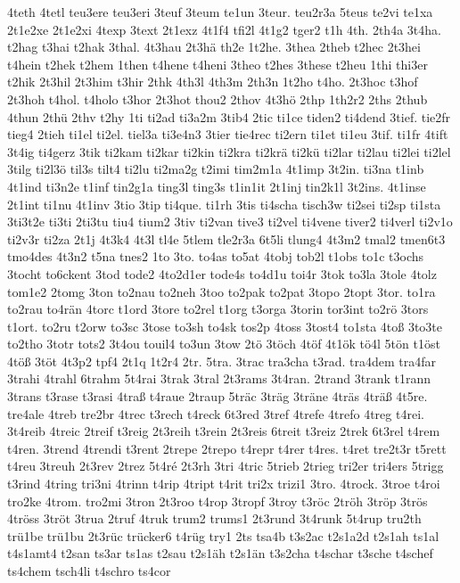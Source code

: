 {4teth
4tetl
teu3ere
teu3eri
3teuf
3teum
te1un
3teur.
teu2r3a
5teus
te2vi
te1xa
2t1e2xe
2t1e2xi
4texp
3text
2t1exz
4t1f4
tfi2l
4t1g2
tger2
t1h
4th.
2th4a
3t4ha.
t2hag
t3hai
t2hak
3thal.
4t3hau
2t3hä
th2e
1t2he.
3thea
2theb
t2hec
2t3hei
t4hein
t2hek
t2hem
1then
t4hene
t4heni
3theo
t2hes
3these
t2heu
1thi
thi3er
t2hik
2t3hil
2t3him
t3hir
2thk
4th3l
4th3m
2th3n
1t2ho
t4ho.
2t3hoc
t3hof
2t3hoh
t4hol.
t4holo
t3hor
2t3hot
thou2
2thov
4t3hö
2thp
1th2r2
2ths
2thub
4thun
2thü
2thv
t2hy
1ti
ti2ad
ti3a2m
3tib4
2tic
ti1ce
tiden2
ti4dend
3tief.
tie2fr
tieg4
2tieh
ti1el
ti2el.
tiel3a
ti3e4n3
3tier
tie4rec
ti2ern
ti1et
ti1eu
3tif.
ti1fr
4tift
3t4ig
ti4gerz
3tik
ti2kam
ti2kar
ti2kin
ti2kra
ti2krä
ti2kü
ti2lar
ti2lau
ti2lei
ti2lel
3tilg
ti2l3ö
til3s
tilt4
ti2lu
ti2ma2g
t2imi
tim2m1a
4t1imp
3t2in.
ti3na
t1inb
4t1ind
ti3n2e
t1inf
tin2g1a
ting3l
ting3s
t1in1it
2t1inj
tin2k1l
3t2ins.
4t1inse
2t1int
ti1nu
4t1inv
3tio
3tip
ti4que.
ti1rh
3tis
ti4scha
tisch3w
ti2sei
ti2sp
ti1sta
3ti3t2e
ti3ti
2ti3tu
tiu4
tium2
3tiv
ti2van
tive3
ti2vel
ti4vene
tiver2
ti4verl
ti2v1o
ti2v3r
ti2za
2t1j
4t3k4
4t3l
tl4e
5tlem
tle2r3a
6t5li
tlung4
4t3m2
tmal2
tmen6t3
tmo4des
4t3n2
t5na
tnes2
1to
3to.
to4as
to5at
4tobj
tob2l
t1obs
to1c
t3ochs
3tocht
to6ckent
3tod
tode2
4to2d1er
tode4s
to4d1u
toi4r
3tok
to3la
3tole
4tolz
tom1e2
2tomg
3ton
to2nau
to2neh
3too
to2pak
to2pat
3topo
2topt
3tor.
to1ra
to2rau
to4rän
4torc
t1ord
3tore
to2rel
t1org
t3orga
3torin
tor3int
to2rö
3tors
t1ort.
to2ru
t2orw
to3sc
3tose
to3sh
to4sk
tos2p
4toss
3tost4
to1sta
4toß
3to3te
to2tho
3totr
tots2
3t4ou
touil4
to3un
3tow
2tö
3töch
4töf
4t1ök
tö4l
5tön
t1öst
4töß
3töt
4t3p2
tpf4
2t1q
1t2r4
2tr.
5tra.
3trac
tra3cha
t3rad.
tra4dem
tra4far
3trahi
4trahl
6trahm
5t4rai
3trak
3tral
2t3rams
3t4ran.
2trand
3trank
t1rann
3trans
t3rase
t3rasi
4traß
t4raue
2traup
5träc
3träg
3träne
4träs
4träß
4t5re.
tre4ale
4treb
tre2br
4trec
t3rech
t4reck
6t3red
3tref
4trefe
4trefo
4treg
t4rei.
3t4reib
4treic
2treif
t3reig
2t3reih
t3rein
2t3reis
6treit
t3reiz
2trek
6t3rel
t4rem
t4ren.
3trend
4trendi
t3rent
2trepe
2trepo
t4repr
t4rer
t4res.
t4ret
tre2t3r
t5rett
t4reu
3treuh
2t3rev
2trez
5t4ré
2t3rh
3tri
4tric
5trieb
2trieg
tri2er
tri4ers
5trigg
t3rind
4tring
tri3ni
4trinn
t4rip
4tript
t4rit
tri2x
trizi1
3tro.
4trock.
3troe
t4roi
tro2ke
4trom.
tro2mi
3tron
2t3roo
t4rop
3tropf
3troy
t3röc
2tröh
3tröp
3trös
4tröss
3tröt
3trua
2truf
4truk
trum2
trums1
2t3rund
3t4runk
5t4rup
tru2th
trü1be
trü1bu
2t3rüc
trücker6
t4rüg
try1
2ts
tsa4b
t3s2ac
t2s1a2d
t2s1ah
ts1al
t4s1amt4
t2san
ts3ar
ts1as
t2sau
t2s1äh
t2s1än
t3s2cha
t4schar
t3sche
t4schef
ts4chem
tsch4li
t4schro
ts4cor
}
